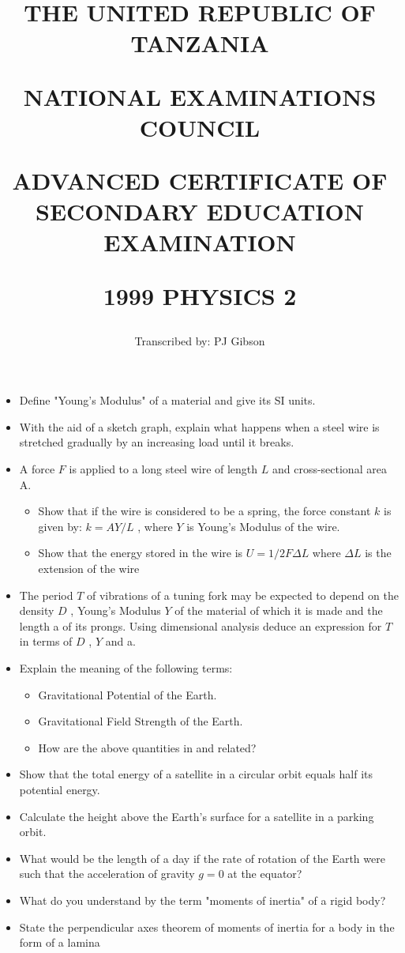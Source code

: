 \documentclass{article}
\title{THE UNITED REPUBLIC OF TANZANIA

NATIONAL EXAMINATIONS COUNCIL

ADVANCED CERTIFICATE OF SECONDARY EDUCATION EXAMINATION

\textbf{1999 PHYSICS 2}}
\author{Transcribed by:  PJ Gibson}
\begin{document}
\maketitle

\begin{itemize}
\item Define "Young's Modulus" of a material and give its SI units.
\item With the aid of a sketch graph, explain what happens when a steel wire is stretched gradually by an increasing load until it breaks. 
\item A force $ F$ is applied to a long steel wire of length $ L$ and cross-sectional area A.
 \begin{itemize}
\item Show that if the wire is considered to be a spring, the force constant $ k$ is given by: $ k= AY/L$ , where $ Y$ is Young's Modulus of the wire.
\item Show that the energy stored in the wire is $ U=1/2F \Delta L$ where $ \Delta{L}$ is the extension of the wire
\end{itemize}
\item The period $ T$ of vibrations of a tuning fork may be expected to depend on the density $ D$ , Young's Modulus $ Y$ of the material of which it is made and the length a of its prongs. Using dimensional analysis deduce an expression for $ T$ in terms of $ D$ , $ Y$ and a.
\item Explain the meaning of the following terms:
 \begin{itemize}
\item Gravitational Potential of the Earth.
\item Gravitational Field Strength of the Earth.
\item How are the above quantities in and related?
\end{itemize}
\item Show that the total energy of a satellite in a circular orbit equals half its potential energy.
\item Calculate the height above the Earth's surface for a satellite in a parking orbit.
\item What would be the length of a day if the rate of rotation of the Earth were such that the acceleration of gravity $ g=0$ at the equator?
\item What do you understand by the term "moments of inertia" of a rigid body?
\item State the perpendicular axes theorem of moments of inertia for a body in the form of a lamina

\end{itemize}
\end{document}
